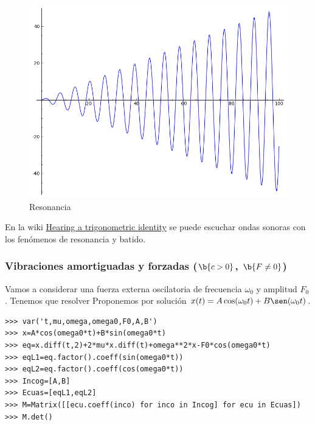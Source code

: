 \begin{figure}[h]
\begin{center}
\includegraphics[scale=0.3]{imagenes/osc_arm_forz_res.png}
\end{center}
\caption{Resonancia}
\end{figure}
En la wiki \href{http://wiki.sagemath.org/interact/misc\#Hearing_a_trigonometric_identity}{Hearing a trigonometric identity}
se puede escuchar ondas sonoras con los fenómenos de resonancia y batido.

\subsubsection{Vibraciones amortiguadas y forzadas ($\b{c>0}$, $\b{F\neq 0}$) }
Vamos a considerar una fuerza externa oscilatoria de frecuencia $\omega_0$ y amplitud $F_0$. Tenemos que resolver
Proponemos por solución $x(t)=A\cos(\omega_0 t)+B\sen(\omega_0 t)$.

\begin{lstlisting}
>>> var('t,mu,omega,omega0,F0,A,B')
>>> x=A*cos(omega0*t)+B*sin(omega0*t)
>>> eq=x.diff(t,2)+2*mu*x.diff(t)+omega**2*x-F0*cos(omega0*t)
>>> eqL1=eq.factor().coeff(sin(omega0*t))
>>> eqL2=eq.factor().coeff(cos(omega0*t))
>>> Incog=[A,B]
>>> Ecuas=[eqL1,eqL2]
>>> M=Matrix([[ecu.coeff(inco) for inco in Incog] for ecu in Ecuas])
>>> M.det()
\end{lstlisting}

